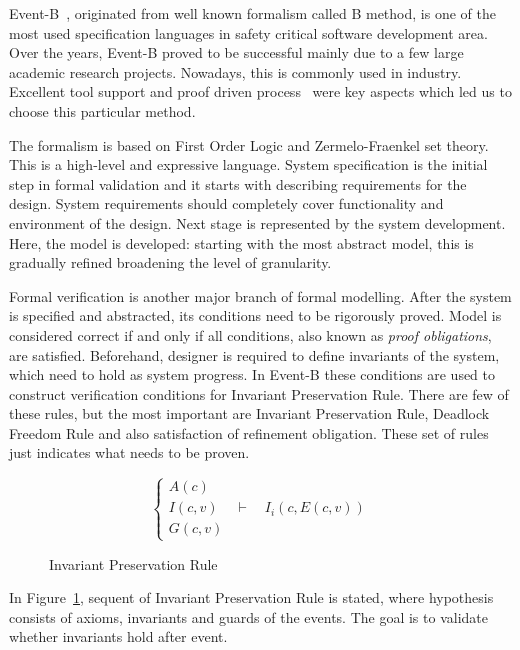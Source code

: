 \documentclass[conference]{IEEEtran}
\begin{document}
Event-B~\cite{eventbbook}, originated from well known formalism called B method, is one of the most used
specification languages in safety critical software development area. Over the years, Event-B
proved to be successful mainly due to a few large academic research projects. Nowadays, this
is commonly used in industry. Excellent tool support and proof driven process~\cite{summevent} 
were key aspects which led us to choose this particular method.

The formalism is based on First Order Logic and Zermelo-Fraenkel set theory. This is a
high-level and expressive language. System specification is the initial
step in formal validation and it starts with describing requirements for the design. System
requirements should completely cover functionality and environment of the design. Next stage
is represented by the system development. Here, the model is developed: starting with the most
abstract model, this is gradually refined broadening the level of granularity.

Formal verification is another major branch of formal modelling. After the system is
specified and abstracted, its conditions need to be rigorously proved. Model is considered
correct if and only if all conditions, also known as \textit{proof obligations}, are
satisfied. Beforehand, designer is required to define invariants of the system, which need to
hold as system progress. In Event-B these conditions are used to construct verification
conditions for Invariant Preservation Rule. There are few of these rules, but the most
important are Invariant Preservation Rule, Deadlock Freedom Rule and also satisfaction of
refinement obligation. These set of rules just indicates what needs to be proven.

\begin{figure}[ht!]
\begin{center}
	$$\begin{cases}
	A(c)\\
	I(c, v) & \vdash \quad I_i(c, E(c,v))\\
	G(c, v)
  \end{cases}$$
	\caption{Invariant Preservation Rule}
	\label{fig:eveB}
\end{center}
\end{figure}

In Figure~\ref{fig:eveB}, sequent of Invariant Preservation Rule is stated, where hypothesis
consists of axioms, invariants and guards of the events. The goal is to validate whether
invariants hold after event.
\end{document}
